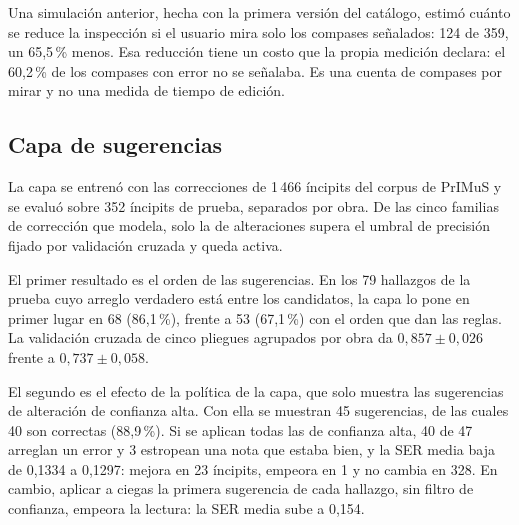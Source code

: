 \documentclass[conference]{IEEEtran}
\begin{document}
Una simulación anterior, hecha con la primera versión del catálogo,
estimó cuánto se reduce la inspección si el usuario mira solo los
compases señalados: 124 de 359, un 65,5\,\% menos. Esa reducción tiene un
costo que la propia medición declara: el 60,2\,\% de los compases con
error no se señalaba. Es una cuenta de compases por mirar y no una medida
de tiempo de edición.

\subsection{Capa de sugerencias}

La capa se entrenó con las correcciones de 1\,466 íncipits del corpus de
PrIMuS y se evaluó sobre 352 íncipits de prueba, separados por obra. De
las cinco familias de corrección que modela, solo la de alteraciones
supera el umbral de precisión fijado por validación cruzada y queda
activa.

El primer resultado es el orden de las sugerencias. En los 79 hallazgos de
la prueba cuyo arreglo verdadero está entre los candidatos, la capa lo
pone en primer lugar en 68 (86,1\,\%), frente a 53 (67,1\,\%) con el orden
que dan las reglas. La validación cruzada de cinco pliegues agrupados por
obra da $0{,}857 \pm 0{,}026$ frente a $0{,}737 \pm 0{,}058$.

El segundo es el efecto de la política de la capa, que solo
muestra las sugerencias de alteración de confianza alta. Con ella se
muestran 45 sugerencias, de las cuales 40 son correctas (88,9\,\%). Si se
aplican todas las de confianza alta, 40 de 47 arreglan un error y 3
estropean una nota que estaba bien, y la SER media baja de 0,1334 a
0,1297: mejora en 23 íncipits, empeora en 1 y no cambia en 328.
En cambio, aplicar a ciegas la primera sugerencia de cada hallazgo, sin
filtro de confianza, empeora la lectura: la SER media sube a 0,154.
\end{document}
